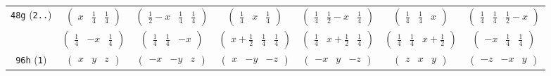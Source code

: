 \documentclass[fleqn,9pt,landscape]{jsarticle}
\begin{document}
\begin{center}
\begin{longtable}{ccccccc}
{\tt 48g} ({\tt 2..}) & $ \begin{pmatrix} x & \frac{1}{4} & \frac{1}{4} \end{pmatrix} $ & $ \begin{pmatrix} \frac{1}{2} - x & \frac{1}{4} & \frac{1}{4} \end{pmatrix} $ & $ \begin{pmatrix} \frac{1}{4} & x & \frac{1}{4} \end{pmatrix} $ & $ \begin{pmatrix} \frac{1}{4} & \frac{1}{2} - x & \frac{1}{4} \end{pmatrix} $ & $ \begin{pmatrix} \frac{1}{4} & \frac{1}{4} & x \end{pmatrix} $ & $ \begin{pmatrix} \frac{1}{4} & \frac{1}{4} & \frac{1}{2} - x \end{pmatrix} $ \\
& $ \begin{pmatrix} \frac{1}{4} & - x & \frac{1}{4} \end{pmatrix} $ & $ \begin{pmatrix} \frac{1}{4} & \frac{1}{4} & - x \end{pmatrix} $ & $ \begin{pmatrix} x + \frac{1}{2} & \frac{1}{4} & \frac{1}{4} \end{pmatrix} $ & $ \begin{pmatrix} \frac{1}{4} & x + \frac{1}{2} & \frac{1}{4} \end{pmatrix} $ & $ \begin{pmatrix} \frac{1}{4} & \frac{1}{4} & x + \frac{1}{2} \end{pmatrix} $ & $ \begin{pmatrix} - x & \frac{1}{4} & \frac{1}{4} \end{pmatrix} $ \\ \hline
{\tt 96h} ({\tt 1}) & $ \begin{pmatrix} x & y & z \end{pmatrix} $ & $ \begin{pmatrix} - x & - y & z \end{pmatrix} $ & $ \begin{pmatrix} x & - y & - z \end{pmatrix} $ & $ \begin{pmatrix} - x & y & - z \end{pmatrix} $ & $ \begin{pmatrix} z & x & y \end{pmatrix} $ & $ \begin{pmatrix} - z & - x & y \end{pmatrix} $ \\

\end{longtable}
\end{center}
\end{document}
